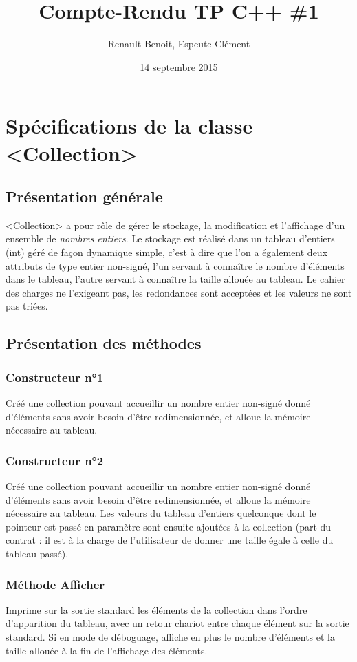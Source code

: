 \documentclass[11pt]{article}
\title{Compte-Rendu TP C++ \#1}
\author{{\sc Renault} Benoit, {\sc Espeute} Clément}
\date{14 septembre 2015}
\begin{document}
\pagestyle{fancy}
\maketitle

\section[Spécifications]{Spécifications de la classe <Collection>}

\subsection{Présentation générale}
<Collection> a pour rôle de gérer le stockage, la modification et l'affichage d'un ensemble de \emph{nombres entiers}. Le stockage est réalisé dans un tableau d'entiers (int) géré de façon dynamique simple, c'est à dire que l'on a également deux attributs de type entier non-signé, l'un servant à connaître le nombre d'éléments dans le tableau, l'autre servant à connaître la taille allouée au tableau. Le cahier des charges ne l'exigeant pas, les redondances sont acceptées et les valeurs ne sont pas triées.

\subsection{Présentation des méthodes}

\subsubsection*{Constructeur n°1}
Créé une collection pouvant accueillir un nombre entier non-signé donné d'éléments sans avoir besoin d'être redimensionnée, et alloue la mémoire nécessaire au tableau.

\subsubsection*{Constructeur n°2}
Créé une collection pouvant accueillir un nombre entier non-signé donné d'éléments sans avoir besoin d'être redimensionnée, et alloue la mémoire nécessaire au tableau. Les valeurs du tableau d'entiers quelconque dont le pointeur est passé en paramètre sont ensuite ajoutées à la collection (part du contrat : il est à la charge de l’utilisateur de donner une taille égale à celle du tableau passé).

\subsubsection*{Méthode Afficher}
Imprime sur la sortie standard les éléments de la collection dans l'ordre d’apparition du tableau, avec un retour chariot entre chaque élément sur la sortie standard. Si en mode de déboguage, affiche en plus le nombre d’éléments et la taille allouée à la fin de l’affichage des éléments.
\end{document}
